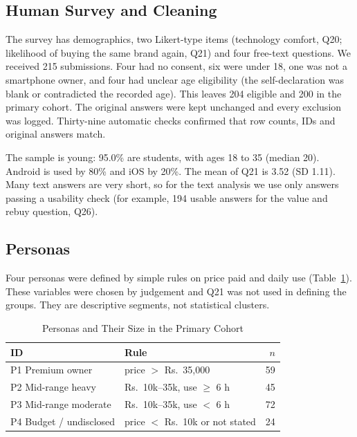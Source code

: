 \documentclass[conference]{IEEEtran}
\begin{document}
\subsection{Human Survey and Cleaning}
The survey has demographics, two Likert-type items (technology comfort, Q20; likelihood of buying the same brand again, Q21) and four free-text questions. We received 215 submissions. Four had no consent, six were under 18, one was not a smartphone owner, and four had unclear age eligibility (the self-declaration was blank or contradicted the recorded age). This leaves 204 eligible and 200 in the primary cohort. The original answers were kept unchanged and every exclusion was logged. Thirty-nine automatic checks confirmed that row counts, IDs and original answers match.

The sample is young: 95.0\% are students, with ages 18 to 35 (median 20). Android is used by 80\% and iOS by 20\%. The mean of Q21 is 3.52 (SD 1.11). Many text answers are very short, so for the text analysis we use only answers passing a usability check (for example, 194 usable answers for the value and rebuy question, Q26).

\subsection{Personas}
Four personas were defined by simple rules on price paid and daily use (Table~\ref{tab:persona}). These variables were chosen by judgement and Q21 was not used in defining the groups. They are descriptive segments, not statistical clusters.

\begin{table}[t]
\caption{Personas and Their Size in the Primary Cohort}
\label{tab:persona}
\centering
\small
\begin{tabular}{@{}llr@{}}
\toprule
ID & Rule & $n$ \\
\midrule
P1 Premium owner & price $>$ Rs.~35,000 & 59 \\
P2 Mid-range heavy & Rs.~10k--35k, use $\geq$ 6 h & 45 \\
P3 Mid-range moderate & Rs.~10k--35k, use $<$ 6 h & 72 \\
P4 Budget / undisclosed & price $<$ Rs.~10k or not stated & 24 \\
\bottomrule
\end{tabular}
\end{table}
\end{document}
